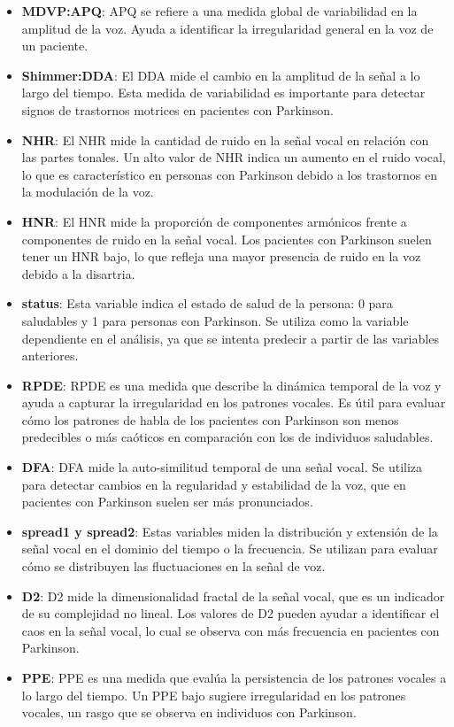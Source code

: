 \documentclass[listof=nochaptergap,12pt,times,authoryear]{report}
\begin{document}
\begin{itemize}
    \item \textbf{MDVP:APQ}: APQ se refiere a una medida global de variabilidad en la amplitud de la voz. Ayuda a identificar la irregularidad general en la voz de un paciente.
    
    \item \textbf{Shimmer:DDA}: El DDA mide el cambio en la amplitud de la señal a lo largo del tiempo. Esta medida de variabilidad es importante para detectar signos de trastornos motrices en pacientes con Parkinson.
    
    \item \textbf{NHR}: El NHR mide la cantidad de ruido en la señal vocal en relación con las partes tonales. Un alto valor de NHR indica un aumento en el ruido vocal, lo que es característico en personas con Parkinson debido a los trastornos en la modulación de la voz.
    
    \item \textbf{HNR}: El HNR mide la proporción de componentes armónicos frente a componentes de ruido en la señal vocal. Los pacientes con Parkinson suelen tener un HNR bajo, lo que refleja una mayor presencia de ruido en la voz debido a la disartria.
    
    \item \textbf{status}: Esta variable indica el estado de salud de la persona: 0 para saludables y 1 para personas con Parkinson. Se utiliza como la variable dependiente en el análisis, ya que se intenta predecir a partir de las variables anteriores.
    
    \item \textbf{RPDE}: RPDE es una medida que describe la dinámica temporal de la voz y ayuda a capturar la irregularidad en los patrones vocales. Es útil para evaluar cómo los patrones de habla de los pacientes con Parkinson son menos predecibles o más caóticos en comparación con los de individuos saludables.
    
    \item \textbf{DFA}: DFA mide la auto-similitud temporal de una señal vocal. Se utiliza para detectar cambios en la regularidad y estabilidad de la voz, que en pacientes con Parkinson suelen ser más pronunciados.
    
    \item \textbf{spread1 y spread2}: Estas variables miden la distribución y extensión de la señal vocal en el dominio del tiempo o la frecuencia. Se utilizan para evaluar cómo se distribuyen las fluctuaciones en la señal de voz.
    
    \item \textbf{D2}: D2 mide la dimensionalidad fractal de la señal vocal, que es un indicador de su complejidad no lineal. Los valores de D2 pueden ayudar a identificar el caos en la señal vocal, lo cual se observa con más frecuencia en pacientes con Parkinson.
    
    \item \textbf{PPE}: PPE es una medida que evalúa la persistencia de los patrones vocales a lo largo del tiempo. Un PPE bajo sugiere irregularidad en los patrones vocales, un rasgo que se observa en individuos con Parkinson.

    \end{itemize}
\end{document}
